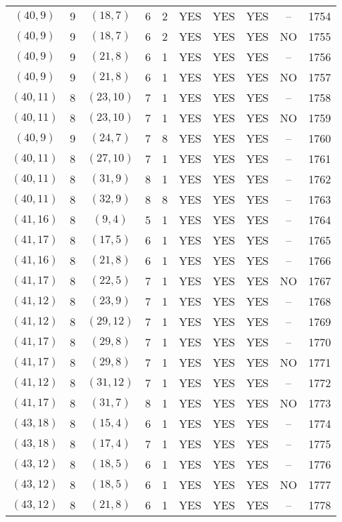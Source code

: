 \begin{longtable}{|c|c|c|c|c|c|c|c|c|c|}
$(40, 9)$ & 9 & $(18, 7)$ & 6 & 2 & YES & YES & YES & -- & 1754\\
$(40, 9)$ & 9 & $(18, 7)$ & 6 & 2 & YES & YES & YES & NO & 1755\\
$(40, 9)$ & 9 & $(21, 8)$ & 6 & 1 & YES & YES & YES & -- & 1756\\
$(40, 9)$ & 9 & $(21, 8)$ & 6 & 1 & YES & YES & YES & NO & 1757\\
$(40, 11)$ & 8 & $(23, 10)$ & 7 & 1 & YES & YES & YES & -- & 1758\\
$(40, 11)$ & 8 & $(23, 10)$ & 7 & 1 & YES & YES & YES & NO & 1759\\
$(40, 9)$ & 9 & $(24, 7)$ & 7 & 8 & YES & YES & YES & -- & 1760\\
$(40, 11)$ & 8 & $(27, 10)$ & 7 & 1 & YES & YES & YES & -- & 1761\\
$(40, 11)$ & 8 & $(31, 9)$ & 8 & 1 & YES & YES & YES & -- & 1762\\
$(40, 11)$ & 8 & $(32, 9)$ & 8 & 8 & YES & YES & YES & -- & 1763\\
$(41, 16)$ & 8 & $(9, 4)$ & 5 & 1 & YES & YES & YES & -- & 1764\\
$(41, 17)$ & 8 & $(17, 5)$ & 6 & 1 & YES & YES & YES & -- & 1765\\
$(41, 16)$ & 8 & $(21, 8)$ & 6 & 1 & YES & YES & YES & -- & 1766\\
$(41, 17)$ & 8 & $(22, 5)$ & 7 & 1 & YES & YES & YES & NO & 1767\\
$(41, 12)$ & 8 & $(23, 9)$ & 7 & 1 & YES & YES & YES & -- & 1768\\
$(41, 12)$ & 8 & $(29, 12)$ & 7 & 1 & YES & YES & YES & -- & 1769\\
$(41, 17)$ & 8 & $(29, 8)$ & 7 & 1 & YES & YES & YES & -- & 1770\\
$(41, 17)$ & 8 & $(29, 8)$ & 7 & 1 & YES & YES & YES & NO & 1771\\
$(41, 12)$ & 8 & $(31, 12)$ & 7 & 1 & YES & YES & YES & -- & 1772\\
$(41, 17)$ & 8 & $(31, 7)$ & 8 & 1 & YES & YES & YES & NO & 1773\\
$(43, 18)$ & 8 & $(15, 4)$ & 6 & 1 & YES & YES & YES & -- & 1774\\
$(43, 18)$ & 8 & $(17, 4)$ & 7 & 1 & YES & YES & YES & -- & 1775\\
$(43, 12)$ & 8 & $(18, 5)$ & 6 & 1 & YES & YES & YES & -- & 1776\\
$(43, 12)$ & 8 & $(18, 5)$ & 6 & 1 & YES & YES & YES & NO & 1777\\
$(43, 12)$ & 8 & $(21, 8)$ & 6 & 1 & YES & YES & YES & -- & 1778\\

\end{longtable}
